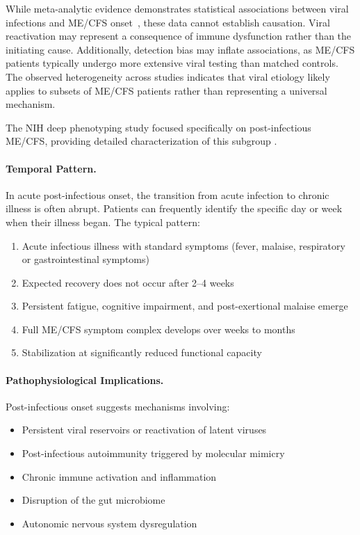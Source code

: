 \begin{warning}
\label{warn:viral-causation}
While meta-analytic evidence demonstrates statistical associations between viral infections and ME/CFS onset~\cite{hwang2023viral}, these data cannot establish causation. Viral reactivation may represent a consequence of immune dysfunction rather than the initiating cause. Additionally, detection bias may inflate associations, as ME/CFS patients typically undergo more extensive viral testing than matched controls. The observed heterogeneity across studies indicates that viral etiology likely applies to subsets of ME/CFS patients rather than representing a universal mechanism.
\end{warning}

The NIH deep phenotyping study focused specifically on post-infectious ME/CFS, providing detailed characterization of this subgroup \cite{walitt2024deep}.

\paragraph{Temporal Pattern.}
In acute post-infectious onset, the transition from acute infection to chronic illness is often abrupt. Patients can frequently identify the specific day or week when their illness began. The typical pattern:
\begin{enumerate}
    \item Acute infectious illness with standard symptoms (fever, malaise, respiratory or gastrointestinal symptoms)
    \item Expected recovery does not occur after 2--4 weeks
    \item Persistent fatigue, cognitive impairment, and post-exertional malaise emerge
    \item Full ME/CFS symptom complex develops over weeks to months
    \item Stabilization at significantly reduced functional capacity
\end{enumerate}

\paragraph{Pathophysiological Implications.}
Post-infectious onset suggests mechanisms involving:
\begin{itemize}
    \item Persistent viral reservoirs or reactivation of latent viruses
    \item Post-infectious autoimmunity triggered by molecular mimicry
    \item Chronic immune activation and inflammation
    \item Disruption of the gut microbiome
    \item Autonomic nervous system dysregulation
\end{itemize}

